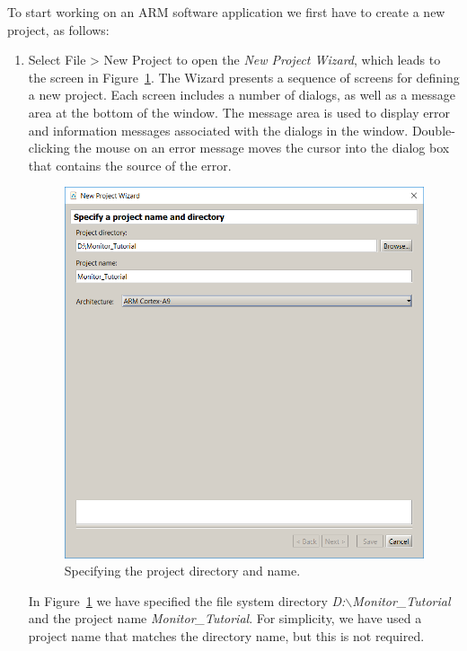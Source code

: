 \documentclass[11pt, twoside, pdftex]{article}
\begin{document}
To start working on an ARM software application we first have to create a new project, as follows: 
\begin{enumerate}
\item
Select {\sf File > New Project} to open the
{\it New Project Wizard}, which leads to the screen 
in Figure~\ref{fig:5}. The Wizard presents a sequence of screens for
defining a new project. Each screen includes a number of dialogs, as well as a message area at the bottom of the window.  
The message area is used to display error and information messages associated with the dialogs in the window. 
Double-clicking the mouse on an error message moves the cursor
into the dialog box that contains the source of the error.

\begin{figure}[H]
   \begin{center}
      \includegraphics[scale=0.5]{screenshots/figure5.png}
   \end{center}
   \caption{Specifying the project directory and name.}
	 \label{fig:5}
\end{figure}

In Figure~\ref{fig:5} we have specified the file system directory
{\it D:$\backslash$Monitor\_Tutorial} and the project 
name {\it Monitor\_Tutorial}. 
For simplicity, we have used a project name that matches the
directory name, but this is not required.


\end{enumerate}
\end{document}
